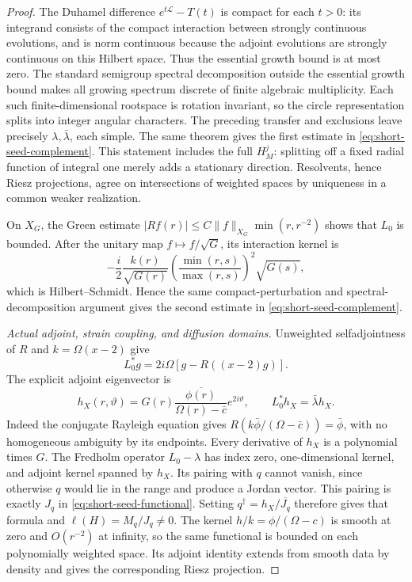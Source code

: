\begin{proof}
The Duhamel difference $e^{t\mathscr L}-T(t)$ is compact for each
$t>0$: its integrand consists of the compact interaction between
strongly continuous evolutions, and is norm continuous because the
adjoint evolutions are strongly continuous on this Hilbert space.
Thus the essential growth bound is at most zero. The standard
semigroup spectral decomposition outside the essential growth bound
\cite[Corollary~IV.2.11 and Theorem~V.3.1]{engel-nagel2000} makes all growing spectrum discrete of finite
algebraic multiplicity. Each such finite-dimensional rootspace is
rotation invariant, so the circle representation splits into integer
angular characters. The preceding transfer and exclusions leave
precisely $\lambda,\bar\lambda$, each simple. The same theorem gives
the first estimate in \eqref{eq:short-seed-complement}.
This statement includes the full $H^j_M$: splitting off a fixed radial
function of integral one merely adds a stationary direction.
Resolvents, hence Riesz projections, agree on intersections of
weighted spaces by uniqueness in a common weaker realization.

On $X_G$, the Green estimate
$|Rf(r)|\le C\|f\|_{X_G}\min(r,r^{-2})$ shows that $L_0$ is bounded.
After the unitary map $f\mapsto f/\sqrt G$, its interaction kernel is
\[
 -\frac i2\frac{k(r)}{\sqrt{G(r)}}
       \left(\frac{\min(r,s)}{\max(r,s)}\right)^2\sqrt{G(s)},
\]
which is Hilbert--Schmidt. Hence the same compact-perturbation and
spectral-decomposition argument gives the second estimate in
\eqref{eq:short-seed-complement}.

\emph{Actual adjoint, strain coupling, and diffusion domains.}
Unweighted selfadjointness of $R$ and $k=\Omega(x-2)$ give
\[
 L_0^*g=2i\Omega[g-R((x-2)g)].
\]
The explicit adjoint eigenvector is
\[
 h_X(r,\vartheta)=G(r)\frac{\overline{\phi(r)}}{
                    \Omega(r)-\bar c}e^{2i\vartheta},
 \qquad L_0^*h_X=\bar\lambda h_X.
\]
Indeed the conjugate Rayleigh equation gives
$R(k\bar\phi/(\Omega-\bar c))=\bar\phi$, with no homogeneous
ambiguity by its endpoints. Every derivative of $h_X$ is a polynomial
times $G$. The Fredholm operator $L_0-\lambda$ has index zero,
one-dimensional kernel, and adjoint kernel spanned by $h_X$.
Its pairing with $q$ cannot vanish, since otherwise $q$ would lie
in the range and produce a Jordan vector. This pairing is exactly
$J_q$ in \eqref{eq:short-seed-functional}. Setting
$q^\dagger=h_X/\overline{J_q}$
therefore gives that formula and
$\ell(H)=M_q/J_q\ne0$. The kernel $h/k=\phi/(\Omega-c)$ is smooth
at zero and $O(r^{-2})$ at infinity, so the same functional is bounded
on each polynomially weighted space. Its adjoint identity extends from
smooth data by density and gives the corresponding Riesz projection.


\end{proof}

